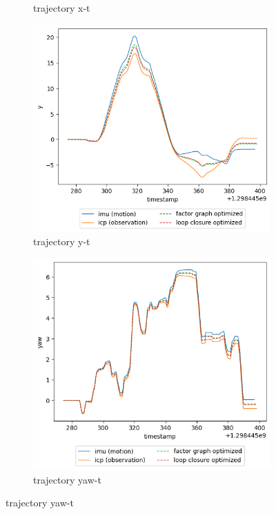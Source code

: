 \documentclass[conference]{IEEEtran}
\begin{document}
\begin{figure}[htbp]
\begin{subfigure}{0.24\textwidth}
        \caption{trajectory x-t}
        \label{fig:trj_20_x}
    \end{subfigure}
    \hfill
    \begin{subfigure}{0.24\textwidth}
        \includegraphics[width=\linewidth]{../img/trj_20_y.png}
        \caption{trajectory y-t}
        \label{fig:trj_20_y}
    \end{subfigure}
    \hfill
    \begin{subfigure}{0.24\textwidth}
        \includegraphics[width=\linewidth]{../img/trj_20_yaw.png}
        \caption{trajectory yaw-t}
        \label{fig:trj_20_yaw}
    \end{subfigure}
    

\end{figure}
\end{document}
